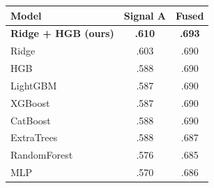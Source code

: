\documentclass[11pt]{article}
\begin{document}
\begin{table}[hb]
\centering
\small
\setlength{\tabcolsep}{4pt}
\begin{tabular}{lcc}
\toprule
Model & Signal A & Fused \\
\midrule
\textbf{Ridge + HGB (ours)} & \textbf{.610} & \textbf{.693} \\ %
\midrule
Ridge                & .603 & .690 \\ %
HGB                  & .588 & .690 \\ %
LightGBM             & .587 & .690 \\ %
XGBoost              & .587 & .690 \\ %
CatBoost             & .588 & .690 \\ %
ExtraTrees           & .588 & .687 \\ %
RandomForest         & .576 & .685 \\ %
MLP                  & .570 & .686 \\ %
\midrule

\end{tabular}
\end{table}
\end{document}
